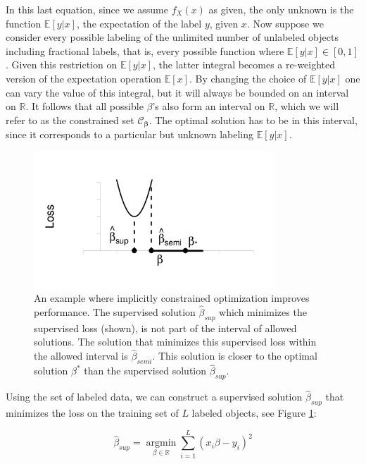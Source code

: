 \documentclass{llncs}
\newcommand{\Nlab}{L}
\begin{document}
In this last equation, since we assume $f_X(x)$ as given, the only unknown is the function $\mathbb{E}[y|x]$, the expectation of the label $y$, given $x$. Now suppose we consider every possible labeling of the unlimited number of unlabeled objects including fractional labels, that is, every possible function where $\mathbb{E}[y|x] \in [0,1]$. Given this restriction on $\mathbb{E}[y|x]$, the latter integral becomes a re-weighted version of the expectation operation $\mathbb{E}[x]$. By changing the choice of $\mathbb{E}[y|x]$ one can vary the value of this integral, but it will always be bounded on an interval on $\mathbb{R}$. It follows that all possible $\beta$'s also form an interval on $\mathbb{R}$, which we will refer to as the constrained set $\mathcal{C}_{\boldsymbol{\beta}}$. The optimal solution has to be in this interval, since it corresponds to a particular but unknown labeling $\mathbb{E}[y|x]$.

\begin{figure}[!ht] 
  \centering
      \includegraphics[width=0.8\textwidth]{ConstrainedProblem-1D.pdf}
  \caption{An example where implicitly constrained optimization improves performance. The supervised solution $\hat{\beta}_{sup}$ which minimizes the supervised loss (shown), is not part of the interval of allowed solutions. The solution that minimizes this supervised loss within the allowed interval is $\hat{\beta}_{semi}$. This solution is closer to the optimal solution ${\beta}^{\ast}$ than the supervised solution $\hat{\beta}_{sup}$.} \label{fig:constrainedproblem}
\end{figure}

Using the set of labeled data, we can construct a supervised solution $\hat{\beta}_{sup}$ that minimizes the loss on the training set of $\Nlab$ labeled objects, see Figure \ref{fig:constrainedproblem}:

\begin{equation} \label{supervisedsolution}
\hat{\beta}_{sup} = \operatorname*{argmin}_{\beta \in \mathbb{R}} \sum_{i=1}^{\Nlab} (x_i \beta - y_i)^2
\end{equation}
\end{document}
